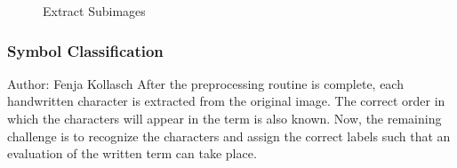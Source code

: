 \documentclass[11pt]{article}
\begin{document}
\begin{figure}[h!]
	\centering
	\quad
	
	\caption{Extract Subimages}
\end{figure}
\subsubsection{Symbol Classification}
\small{Author: Fenja Kollasch} \newline \newline
After the preprocessing routine is complete, each handwritten character is extracted from the original image. The correct order in which the characters will appear in the term is also known. Now, the remaining challenge is to recognize the characters and assign the correct labels such that an evaluation of the written term can take place.
	
\end{document}
